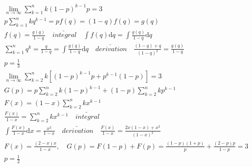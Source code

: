 \documentclass{article}
\begin{document}
\begin{align*}
    \lim_{n \to \infty}\sum_{k=1}^{n} k(1-p)^{k-1} p = 3 \\
    p\sum_{k=1}^{n}kq^{k-1} = pf(q) = (1-q)f(q) = g(q)\\
    f(q) = \frac{g(q)}{1-q} \quad \underrightarrow{integral} \quad \int f(q) \mathrm{d}q = \int \frac{g(q)}{1-q}\mathrm{d}q\\
    \sum_{k=1}^{n}q^{k} = \frac{q}{1-q} = \int \frac{g(q)}{1-q}\mathrm{d}q \quad \underrightarrow{derivation} \quad \frac{(1-q)+q}{(1-q)^2} = \frac{g(q)}{1-q}\\
    p = \frac{1}{3} \\ 
    \lim_{n \to \infty}\sum_{k=2}^{n} k[(1-p)^{k-1}p + p^{k-1}(1-p)] = 3 \\ 
    G(p) = p\sum_{k=2}^{n}k(1-p)^{k-1} + (1-p)\sum_{k=2}^{n}kp^{k-1} \\
    F(x) = (1-x)\sum_{k=2}^{n}kx^{k-1} \\ \frac{F(x)}{1-x} = \sum_{k=2}^{n}kx^{k-1} \quad \underrightarrow{integral} \quad \\
    \int \frac{F(x)}{1-x} \mathrm{d}x = \frac{x^2}{1-x} \quad \underrightarrow{derivation} \quad \frac{F(x)}{1-x} = \frac{2x(1-x)+x^2}{(1-x)^2}\\
    F(x) = \frac{(2-x)x}{1-x}, \quad G(p) = F(1-p) + F(p) = \frac{(1-p)(1+p)}{p} + \frac{(2-p)p}{1-p} = 3\\
    p = \frac{1}{2} \\ 
\end{align*}
\end{document}

